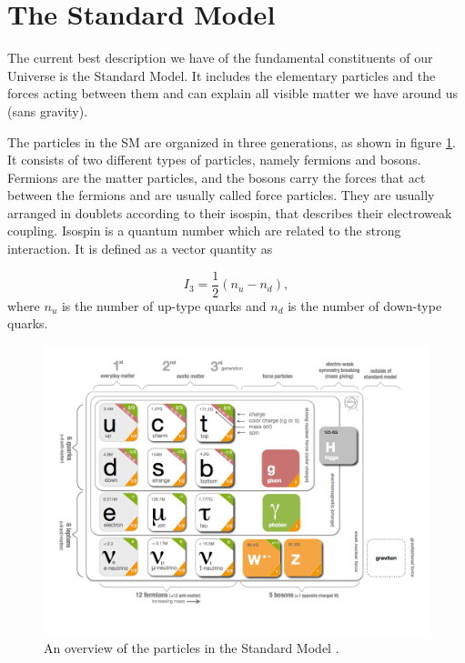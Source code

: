 \section{The Standard Model}
\label{sec:SM}
The current best description we have of the fundamental constituents of our Universe is the Standard Model. It includes the elementary particles and the forces acting between them and can explain all visible matter we have around us (sans gravity). 

The particles in the SM are organized in three generations, as shown in figure \ref{fig:SM}. It consists of two different types of particles, namely fermions and bosons. Fermions are the matter particles, and the bosons carry the forces that act between the fermions and are usually called force particles. They are usually arranged in doublets according to their isospin, that describes their electroweak coupling. Isospin is a quantum number which are related to the strong interaction. It is defined as a vector quantity as

\begin{equation}
    \label{eq:isospin}
    I_{3}={\frac {1}{2}}(n_{u}-n_{d}),
\end{equation}
where $n_u$ is the number of up-type quarks and $n_d$ is the number of down-type quarks. 





\begin{figure}[H]
    \centering
    \includegraphics[width=\textwidth]{Figures/FromOnline/SM.png}
    \caption{An overview of the particles in the Standard Model \cite{SMpicture}.}
    \label{fig:SM}
\end{figure}

